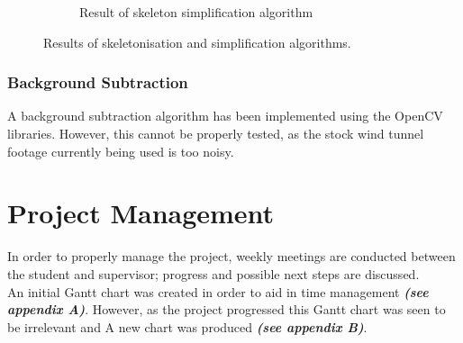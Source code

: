 \documentclass[a4paper, 12pt]{article}
\begin{document}
\begin{figure}[H]
\begin{subfigure}{\textwidth}
  		\caption{Result of skeleton simplification algorithm}
  		\label{fig:skel_reduced}
	\end{subfigure}
\caption{Results of skeletonisation and simplification algorithms.}
\end{figure}
%
\subsubsection{Background Subtraction}
	A background subtraction algorithm has been implemented using the OpenCV libraries\cite{OpenCV}. However, this cannot be properly tested, as the stock wind tunnel footage currently being used is too noisy.
\section{Project Management}
In order to properly manage the project, weekly meetings are conducted between the student and supervisor; progress and possible next steps are discussed.\\
An initial Gantt chart was created in order to aid in time management \textbf{\emph{(see appendix A)}}. However, as the project progressed this Gantt chart was seen to be irrelevant and A new chart was produced \textbf{\emph{(see appendix B)}}.
\end{document}
